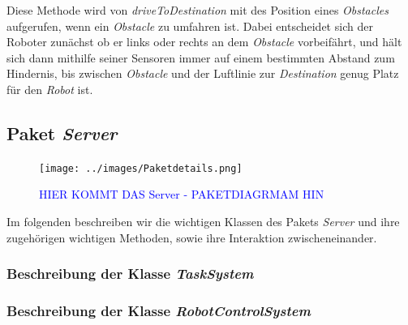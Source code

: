 			Diese Methode wird von \textit{driveToDestination} mit des Position eines \textit{Obstacles} aufgerufen, 
			wenn ein \textit{Obstacle} zu umfahren ist.
			Dabei entscheidet sich der Roboter zunächst ob er links oder rechts an dem \textit{Obstacle} vorbeifährt, 
			und hält sich dann mithilfe seiner Sensoren immer auf einem bestimmten Abstand zum Hindernis, bis zwischen 
			\textit{Obstacle} und der Luftlinie zur \textit{Destination} genug Platz für den \textit{Robot} ist.
	
\subsection{Paket \textit{Server}}
\begin{figure}[H]
	\centering
	\texttt{[image: ../images/Paketdetails.png]}
	\caption{\textcolor{blue}{HIER KOMMT DAS Server - PAKETDIAGRMAM HIN}}
	\label{Paketdetails}
	\end{figure}
	Im folgenden beschreiben wir die wichtigen Klassen des Pakets \textit{Server} 
	und ihre zugehörigen wichtigen Methoden, sowie ihre Interaktion zwischeneinander. 


	\subsubsection{Beschreibung der Klasse \textit{TaskSystem}}
		
			
	\subsubsection{Beschreibung der Klasse \textit{RobotControlSystem}}
		
